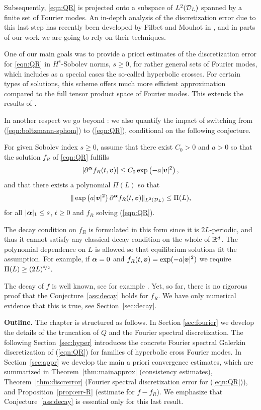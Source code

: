 Subsequently, \eqref{eqn:QR} is projected onto a subspace of $L^{2}(\mathcal{D}_{L})$ spanned by a
finite set of Fourier modes. An in-depth analysis of the discretization error due
to this last step has recently been developed by Filbet and Mouhot in \cite{Filbet2011asm},
and in parts of our work we are going to rely on their techniques. 

One of our main goals was to provide a priori estimates of the discretization error for \eqref{eqn:QR} in
$H^{s}$-Sobolev norms, $s\geq 0$, for rather general sets of Fourier modes, which includes as a special cases
the so-called hyperbolic crosses. For certain types of solutions, this scheme offers much more efficient
approximation compared to the full tensor product space of Fourier modes. This extends the results of
\cite{Filbet2011asm}.

In another respect we go beyond \cite{Filbet2011asm}: we also quantify the impact of
switching from (\ref{eqn:boltzmann-sphom}) to (\ref{eqn:QR}), conditional
on the following conjecture.
\begin{conjecture} \label{ass:decay}
  For given Sobolev index $s\geq 0$, assume that there exist $C_0>0$ and $a>0$ so that the solution
  $f_R$ of \eqref{eqn:QR} fulfills
  $$
  |\partial^{\bm\alpha} f_R(t,{\bm v})| \le C_0\exp\left(-a|{\bm v}|^2\right),
  $$
  and that there exists a polynomial $\Pi(L)$ so that
  $$
  \| \exp\left(a|{\bm v}|^2\right) \partial^{\bm\alpha} f_R(t,{\bm v}) \|_{L^2(\mathcal{D}_L)} \leq
  \Pi(L),
  $$
  for all $|{\bm\alpha}|_1\leq s$, $t\geq0$ and $f_{R}$ solving (\ref{eqn:QR}).
\end{conjecture}
\begin{remark}
  The decay condition on $f_R$ is formulated in this form since it is
  $2L$-periodic, and thus it cannot satisfy any classical decay condition on the
  whole of $\mathbb{R}^d$. The polynomial dependence on $L$ is allowed so that 
  equilibrium solutions fit the assumption. For example, if ${\bm\alpha}=0$ and 
  $f_R(t,{\bm v})=\exp(-a|{\bm v}|^2)$ we require $\Pi(L) \geq (2L)^{\nicefrac{d}{2}}$.
  
  The decay of $f$ is well known, see for example \cite{Bobylev1997mib}.  Yet, so far,
  there is no rigorous proof that the Conjecture~\ref{ass:decay} holds for
  $f_R$. We have only numerical evidence that this is true, see
  Section~\ref{sec:decay}.
\end{remark}

\textbf{Outline.} The chapter is structured as follows. In Section \ref{sec:fourier}
we develop the details of the truncation of $Q$ and the Fourier spectral discretization.
The following Section~\ref{sec:hyper} introduces the concrete Fourier spectral 
Galerkin discretization of (\ref{eqn:QR}) for families of hyperbolic cross Fourier
modes. In Section~\ref{sec:appr} we develop the main a priori convergence
estimates, which are summarized in Theorem~\ref{thm:mainapprox} (consistency
estimates), Theorem~\ref{thm:discrerror} (Fourier spectral discretization error
for (\ref{eqn:QR})), and Proposition~\ref{prop:err-R} (estimate for $f-f_{R}$). 
We emphasize that Conjecture~\ref{ass:decay} is essential only for this last result.

